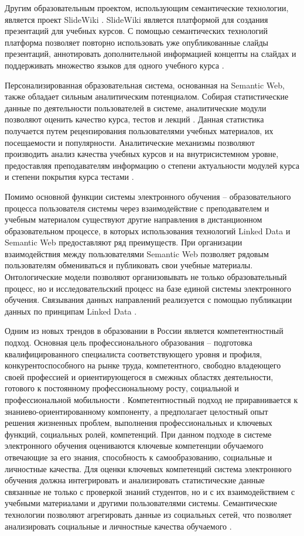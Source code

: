 Другим образовательным проектом, использующим семантические технологии, является проект SlideWiki \cite{khalili2012slidewiki}. SlideWiki является платформой для создания презентаций для учебных курсов. С помощью семантических технологий платформа позволяет повторно использовать уже опубликованные слайды презентаций, аннотировать дополнительной информацией концепты на слайдах и поддерживать множество языков для одного учебного курса \cite{tarasowa2014crowd}.

Персонализированная образовательная система, основанная на Semantic Web, также обладает сильным аналитическим потенциалом.  Собирая статистические данные по деятельности пользователей в системе, аналитические модули позволяют оценить качество курса, тестов и лекций \cite{aroyo2004new}. Данная статистика получается путем рецензирования пользователями учебных материалов, их посещаемости и популярности. Аналитические механизмы позволяют производить анализ качества учебных курсов и на внутрисистемном уровне, предоставляя преподавателям информацию о степени актуальности модулей курса и степени покрытия курса тестами \cite{puustjarvi2004integrating}.

Помимо основной функции системы электронного обучения – образовательного процесса  пользователя системы через взаимодействие с преподавателем и учебным материалом существуют другие направления в дистанционном образовательном процессе, в которых использования технологий Linked Data и Semantic Web предоставляют ряд преимуществ. При организации взаимодействия между пользователями Semantic Web позволяет рядовым пользователям обмениваться и публиковать свои учебные материалы. Онтологические модели позволяют организовывать не только образовательный процесс, но и исследовательский процесс на базе единой системы электронного обучения. Связывания данных направлений реализуется с помощью публикации данных по принципам Linked Data \cite{white2013conceptual}. 

Одним из новых трендов в образовании в России является компетентностный подход.
Основная цель профессионального образования – подготовка квалифицированного специалиста соответствующего уровня и профиля, конкурентоспособного на рынке труда, компетентного, свободно владеющего своей профессией и ориентирующегося в смежных областях деятельности, готового к постоянному профессиональному росту, социальной и профессиональной мобильности \cite{chel2013control}. Компетентностный подход не приравнивается к знаниево-ориентированному компоненту, а предполагает целостный опыт решения жизненных проблем, выполнения профессиональных и ключевых функций, социальных ролей, компетенций. При данном подходе в системе электронного обучения оцениваются ключевые компетенции обучаемого отвечающие за его знания, способность к самообразованию, социальные и личностные качества. Для оценки ключевых компетенций система электронного обучения должна интегрировать и анализировать статистические данные связанные не только с проверкой знаний студентов, но и с их взаимодействием с учебными материалами и другими пользователями системы. Семантические технологии позволяют агрегировать данные из социальных сетей, что позволяет анализировать социальные и личностные качества обучаемого \cite{abel2013cross}.  


